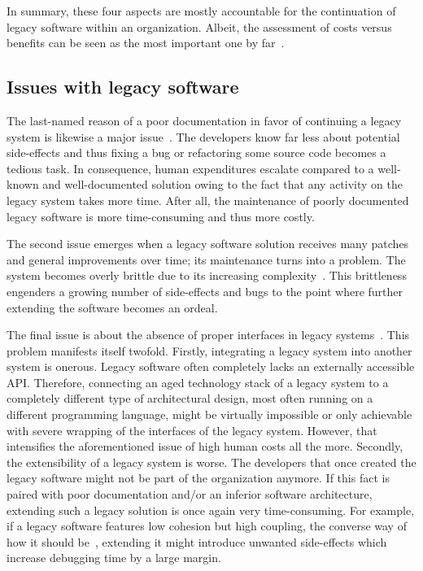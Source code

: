 \documentclass[12pt,a4paper,twoside]{report}
\begin{document}
In summary, these four aspects are mostly accountable for the continuation of legacy software
within an organization. Albeit, the assessment of costs versus benefits
can be seen as the most important one by far~\cite{schneidewind-preserve-or-redesign}.


\subsection{Issues with legacy software} \label{issues-legacy-software}

The last-named reason of a poor documentation in favor of continuing a
legacy system is likewise a major issue~\cite{bisbal-legacy-issues}.
The developers know far less about potential side-effects and thus
fixing a bug or refactoring some source code becomes a tedious task.
In consequence, human expenditures escalate compared to a well-known and well-documented
solution owing to the fact that any activity on the legacy system takes more time.
After all, the maintenance of poorly documented legacy software
is more time-consuming and thus more costly.

The second issue emerges when a legacy software solution receives many
patches and general improvements over time; its maintenance
turns into a problem. The system becomes overly brittle due to its
increasing complexity~\cite{seacord-modernizing-legacy, tilley-perspectives-reengineering}.
This brittleness engenders a growing number of side-effects and bugs
to the point where further extending the software becomes an ordeal.

The final issue is about the absence of proper interfaces
in legacy systems~\cite{bisbal-legacy-issues}. This problem manifests itself twofold.
Firstly, integrating a legacy system into another system is onerous.
Legacy software often completely lacks an externally accessible API.
Therefore, connecting an aged technology stack of a legacy system to a completely
different type of architectural design, most often running on a different programming language,
might be virtually impossible or only achievable with severe wrapping
of the interfaces of the legacy system. However, that intensifies the aforementioned
issue of high human costs all the more.
Secondly, the extensibility of a legacy system is worse.
The developers that once created the legacy software might not be part of the
organization anymore. If this fact is paired with poor documentation and/or
an inferior software architecture, extending such a legacy solution is once again
very time-consuming. For example, if a legacy software features
low cohesion but high coupling, the converse way of how it
should be~\cite{mcconnell-code-complete}, extending it might introduce
unwanted side-effects which increase debugging time by a large margin.
\end{document}
